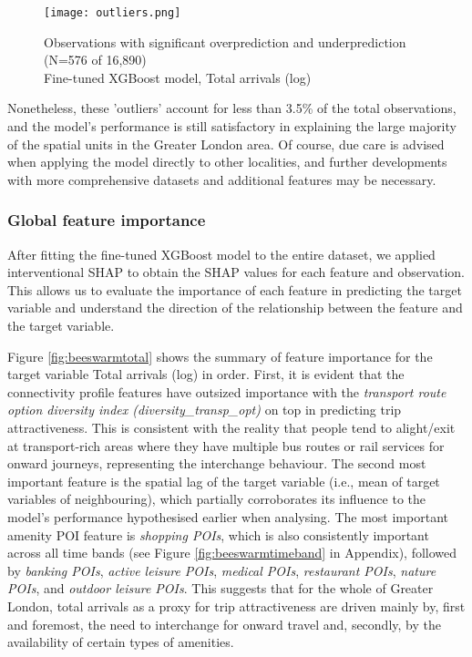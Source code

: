 \begin{figure}[hbt]
    \centering
    \texttt{[image: outliers.png]}
    \captionsetup{justification=centering}
    \caption{Observations with significant overprediction and underprediction (N=576 of 16,890)\\Fine-tuned XGBoost model, Total arrivals (log)}
    \label{fig:outliers}
\end{figure}

Nonetheless, these 'outliers' account for less than 3.5\% of the total observations, and the model's performance is still satisfactory in explaining the large majority of the spatial units in the Greater London area. Of course, due care is advised when applying the model directly to other localities, and further developments with more comprehensive datasets and additional features may be necessary.

\subsubsection*{Global feature importance}

After fitting the fine-tuned XGBoost model to the entire dataset, we applied interventional SHAP to obtain the SHAP values for each feature and observation. This allows us to evaluate the importance of each feature in predicting the target variable and understand the direction of the relationship between the feature and the target variable. 

Figure \ref{fig:beeswarmtotal} shows the summary of feature importance for the target variable Total arrivals (log) in order. First, it is evident that the connectivity profile features have outsized importance with the \textit{transport route option diversity index (diversity\_transp\_opt)} on top in predicting trip attractiveness. This is consistent with the reality that people tend to alight/exit at transport-rich areas where they have multiple bus routes or rail services for onward journeys, representing the interchange behaviour. The second most important feature is the spatial lag of the target variable (i.e., mean of target variables of neighbouring), which partially corroborates its influence to the model's performance hypothesised earlier when analysing. The most important amenity POI feature is \textit{shopping POIs}, which is also consistently important across all time bands (see Figure \ref{fig:beeswarmtimeband} in Appendix), followed by \textit{banking POIs}, \textit{active leisure POIs}, \textit{medical POIs}, \textit{restaurant POIs}, \textit{nature POIs}, and \textit{outdoor leisure POIs}. This suggests that for the whole of Greater London, total arrivals as a proxy for trip attractiveness are driven mainly by, first and foremost, the need to interchange for onward travel and, secondly, by the availability of certain types of amenities.

